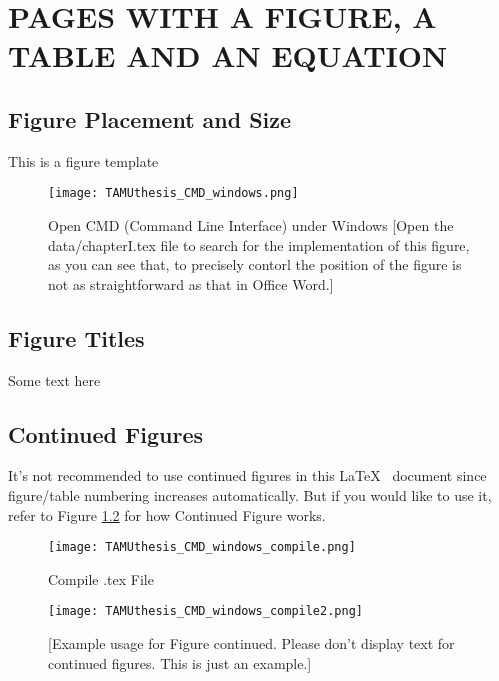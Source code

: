 

\chapter{PAGES WITH A FIGURE, A TABLE AND AN EQUATION}
\section{Figure Placement and Size}
This is a figure template
\begin{figure}[ht]
\centering
\texttt{[image: TAMUthesis\_CMD\_windows.png]}
\caption[Open CMD (Command Line Interface) under Windows]{Open CMD (Command Line Interface) under Windows
[Open the data/chapterI.tex file to search for the implementation of this figure, as you can
see that, to precisely contorl the position of the figure is not as straightforward as that in
Office Word.]}

\label{fig:CMD_1}

\end{figure}

\section{Figure Titles}

Some text here

\section{Continued Figures}
It's not recommended to use continued figures in this \LaTeX ~ document since figure/table numbering increases automatically. But if you would like to use it, refer to Figure \ref{fig:CMD_windows_cd_compile} for how Continued Figure works.

\begin{figure}[ht]
\centering
\texttt{[image: TAMUthesis\_CMD\_windows\_compile.png]}
\caption{Compile .tex File}

\label{fig:CMD_windows_cd_compile}

\end{figure}
\cleardoublepage


\begin{figure}[ht]
\ContinuedFloat
\captionsetup{list=off, format=cont}
\centering
\texttt{[image: TAMUthesis\_CMD\_windows\_compile2.png]}
\caption{[Example usage for Figure continued. Please don't display text for continued figures. This is just an example.]}

\label{fig:CMD_windows_cd_compile_continued}

\end{figure}


